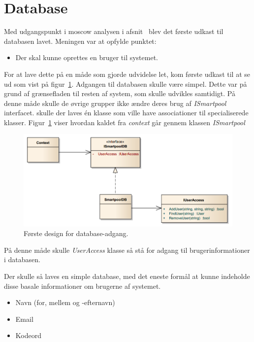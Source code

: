 \section{Database}

Med udgangspunkt i \gls{moscow} analysen i afsnit~\pageref{sec:moscow} blev det første udkast til databasen lavet. Meningen var at opfylde punktet: 

\begin{itemize}
	\item Der skal kunne oprettes en bruger til systemet.
\end{itemize}

For at lave dette på en måde som gjorde udvidelse let, kom første udkast til at se ud som vist på figur~\ref{fig:database_class_1}. Adgangen til databasen skulle være simpel. Dette var på grund af grænsefladen til resten af system, som skulle udvikles samtidigt. På denne måde skulle de øvrige grupper ikke ændre deres brug af \textit{ISmartpool} interfacet.  skulle der laves én klasse som ville have associationer til specialiserede klasser. Figur~\ref{fig:database_class_1} viser hvordan kaldet fra \textit{context} går gennem klassen \textit{ISmartpool}

\begin{figure}[h]
	\centering
	\includegraphics[width=0.9\linewidth]{figs/design/database_class_1}
	\caption{Første design for database-adgang.}
	\label{fig:database_class_1}
\end{figure}

På denne måde skulle \textit{UserAccess} klasse så stå for adgang til brugerinformationer i databasen. 

Der skulle så laves en simple database, med det eneste formål at kunne indeholde disse basale informationer om brugerne af systemet.

\begin{itemize}
	\item Navn (for, mellem og -efternavn)
	\item Email
	\item Kodeord
\end{itemize}

